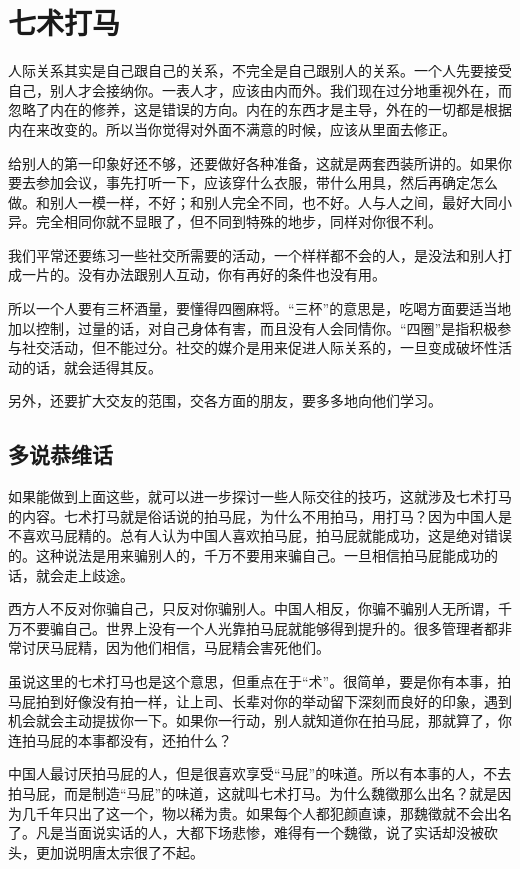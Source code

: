 \documentclass[fontset=fandol, a4paper, 12pt, openright]{ctexbook}
\begin{document}
\chapter{七术打马}
人际关系其实是自己跟自己的关系，不完全是自己跟别人的关系。一个人先要接受自己，别人才会接纳你。一表人才，应该由内而外。我们现在过分地重视外在，而忽略了内在的修养，这是错误的方向。内在的东西才是主导，外在的一切都是根据内在来改变的。所以当你觉得对外面不满意的时候，应该从里面去修正。

给别人的第一印象好还不够，还要做好各种准备，这就是两套西装所讲的。如果你要去参加会议，事先打听一下，应该穿什么衣服，带什么用具，然后再确定怎么做。和别人一模一样，不好；和别人完全不同，也不好。人与人之间，最好大同小异。完全相同你就不显眼了，但不同到特殊的地步，同样对你很不利。

我们平常还要练习一些社交所需要的活动，一个样样都不会的人，是没法和别人打成一片的。没有办法跟别人互动，你有再好的条件也没有用。

所以一个人要有三杯酒量，要懂得四圈麻将。“三杯”的意思是，吃喝方面要适当地加以控制，过量的话，对自己身体有害，而且没有人会同情你。“四圈”是指积极参与社交活动，但不能过分。社交的媒介是用来促进人际关系的，一旦变成破坏性活动的话，就会适得其反。

另外，还要扩大交友的范围，交各方面的朋友，要多多地向他们学习。

\section{多说恭维话}

如果能做到上面这些，就可以进一步探讨一些人际交往的技巧，这就涉及七术打马的内容。七术打马就是俗话说的拍马屁，为什么不用拍马，用打马？因为中国人是不喜欢马屁精的。总有人认为中国人喜欢拍马屁，拍马屁就能成功，这是绝对错误的。这种说法是用来骗别人的，千万不要用来骗自己。一旦相信拍马屁能成功的话，就会走上歧途。

西方人不反对你骗自己，只反对你骗别人。中国人相反，你骗不骗别人无所谓，千万不要骗自己。世界上没有一个人光靠拍马屁就能够得到提升的。很多管理者都非常讨厌马屁精，因为他们相信，马屁精会害死他们。

虽说这里的七术打马也是这个意思，但重点在于“术”。很简单，要是你有本事，拍马屁拍到好像没有拍一样，让上司、长辈对你的举动留下深刻而良好的印象，遇到机会就会主动提拔你一下。如果你一行动，别人就知道你在拍马屁，那就算了，你连拍马屁的本事都没有，还拍什么？

中国人最讨厌拍马屁的人，但是很喜欢享受“马屁”的味道。所以有本事的人，不去拍马屁，而是制造“马屁”的味道，这就叫七术打马。为什么魏徵那么出名？就是因为几千年只出了这一个，物以稀为贵。如果每个人都犯颜直谏，那魏徵就不会出名了。凡是当面说实话的人，大都下场悲惨，难得有一个魏徵，说了实话却没被砍头，更加说明唐太宗很了不起。
\end{document}
